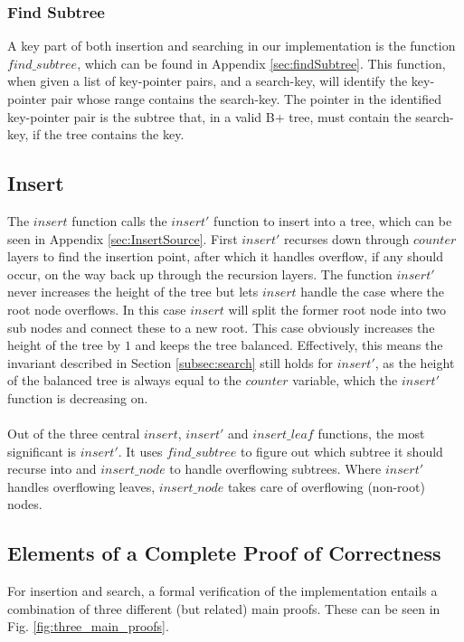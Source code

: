\subsubsection{Find Subtree}
A key part of both insertion and searching in our implementation is the function $find\_subtree$, which can be found in Appendix \ref{sec:findSubtree}. This function, when given a list of key-pointer pairs, and a search-key, will identify the key-pointer pair whose range contains the search-key. The pointer in the identified key-pointer pair is the subtree that, in a valid B+ tree, must contain the search-key, if the tree contains the key.

\subsection{Insert}
The $insert$ function calls the $insert'$ function to insert into a tree, which can be seen in Appendix \ref{sec:InsertSource}. First $insert'$ recurses down through $counter$ layers to find the insertion point, after which it handles overflow, if any should occur, on the way back up through the recursion layers. The function $insert'$ never increases the height of the tree but lets $insert$ handle the case where the root node overflows. In this case $insert$ will split the former root node into two sub nodes and connect these to a new root. This case obviously increases the height of the tree by $1$ and keeps the tree balanced. Effectively, this means the invariant described in Section \ref{subsec:search} still holds for $insert'$, as the height of the balanced tree is always equal to the $counter$ variable, which the $insert'$ function is decreasing on.

\paragraph{}
Out of the three central $insert$, $insert'$ and $insert\_leaf$ functions, the most significant is $insert'$. It uses $find\_subtree$ to figure out which subtree it should recurse into and $insert\_node$ to handle overflowing subtrees. Where $insert'$ handles overflowing leaves, $insert\_node$ takes care of overflowing (non-root) nodes.

\subsection{Elements of a Complete Proof of Correctness}
\label{sec:ElementsOfACompleteProof}
For insertion and search, a formal verification of the implementation entails a combination of three different (but related) main proofs. These can be seen in Fig. \ref{fig:three_main_proofs}.

